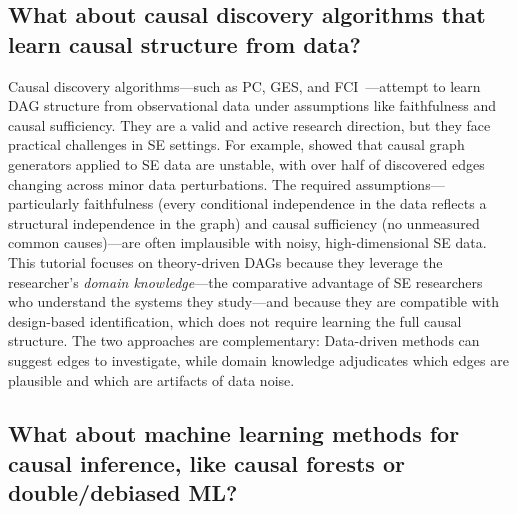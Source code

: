 
\subsection{What about causal discovery algorithms that learn causal structure from data?}

Causal discovery algorithms---such as PC, GES, and FCI~\cite{spirtes2001causation}---attempt to learn DAG structure from observational data under assumptions like faithfulness and causal sufficiency.
They are a valid and active research direction, but they face practical challenges in SE settings.
For example, \citet{journals/ese/HulseEM25} showed that causal graph generators applied to SE data are unstable, with over half of discovered edges changing across minor data perturbations.
The required assumptions---particularly faithfulness (every conditional independence in the data reflects a structural independence in the graph) and causal sufficiency (no unmeasured common causes)---are often implausible with noisy, high-dimensional SE data.
This tutorial focuses on theory-driven DAGs because they leverage the researcher's \emph{domain knowledge}---the comparative advantage of SE researchers who understand the systems they study---and because they are compatible with design-based identification, which does not require learning the full causal structure.
The two approaches are complementary: Data-driven methods can suggest edges to investigate, while domain knowledge adjudicates which edges are plausible and which are artifacts of data noise.

\subsection{What about machine learning methods for causal inference, like causal forests or double/debiased ML?}


